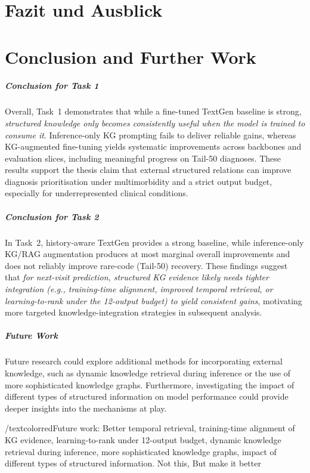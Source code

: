 {\chapter{Fazit und Ausblick}}
{\chapter{Conclusion and Further Work}}

\label{sec:conclusion}

\paragraph{Conclusion for Task 1}
Overall, Task~1 demonstrates that while a fine-tuned TextGen baseline is strong, \emph{structured knowledge only becomes consistently useful when the model is trained to consume it}. Inference-only KG prompting fails to deliver reliable gains, whereas KG-augmented fine-tuning yields systematic improvements across backbones and evaluation slices, including meaningful progress on Tail-50 diagnoses. These results support the thesis claim that external structured relations can improve diagnosis prioritisation under multimorbidity and a strict output budget, especially for underrepresented clinical conditions.

\paragraph{Conclusion for Task 2}
In Task~2, history-aware TextGen provides a strong baseline, while inference-only KG/RAG augmentation produces at most marginal overall improvements and does not reliably improve rare-code (Tail-50) recovery. These findings suggest that \emph{for next-visit prediction, structured KG evidence likely needs tighter integration (e.g., training-time alignment, improved temporal retrieval, or learning-to-rank under the 12-output budget) to yield consistent gains}, motivating more targeted knowledge-integration strategies in subsequent analysis.

\paragraph{Future Work}
Future research could explore additional methods for incorporating external knowledge, such as dynamic knowledge retrieval during inference or the use of more sophisticated knowledge graphs. Furthermore, investigating the impact of different types of structured information on model performance could provide deeper insights into the mechanisms at play.

/textcolor{red}{Future work: Better temporal retrieval, training-time alignment of KG evidence, learning-to-rank under 12-output budget, dynamic knowledge retrieval during inference, more sophisticated knowledge graphs, impact of different types of structured information. Not this, But make it better}